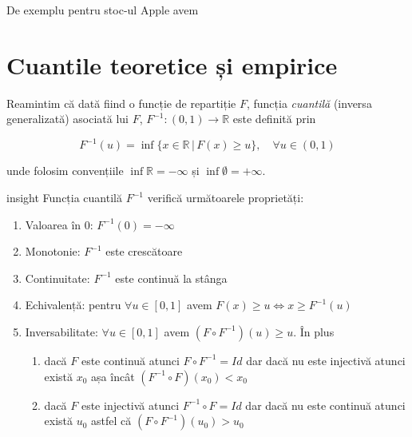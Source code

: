 \documentclass[]{article}
\newenvironment{Shaded}{\begin{snugshade}}{\end{snugshade}}
\newcommand{\KeywordTok}[1]{\textcolor[rgb]{0.13,0.29,0.53}{\textbf{#1}}}
\newcommand{\DecValTok}[1]{\textcolor[rgb]{0.00,0.00,0.81}{#1}}
\newcommand{\FloatTok}[1]{\textcolor[rgb]{0.00,0.00,0.81}{#1}}
\newcommand{\OperatorTok}[1]{\textcolor[rgb]{0.81,0.36,0.00}{\textbf{#1}}}
\newcommand{\NormalTok}[1]{#1}
\providecommand{\tightlist}{%
  \setlength{\itemsep}{0pt}\setlength{\parskip}{0pt}}
\newenvironment{frshaded_insight*}{%
  \def\FrameCommand{\fboxrule=\FrameRule\fboxsep=\FrameSep \fcolorbox{framecolor_insight}{shadecolor_insight}}%
  \MakeFramed {\advance\hsize-\width \FrameRestore}}%
{\endMakeFramed}
\newenvironment{rmdblock_insight}[1]
  {\begin{frshaded_insight*}
  \begin{itemize}
  \renewcommand{\labelitemi}{
    \raisebox{-.7\height}[0pt][0pt]{
      {\setkeys{Gin}{width=2em,keepaspectratio}\texttt{[image: images/icons/\#1]}}
    }
  }
  \item
  }
  {
  \end{itemize}
  \end{frshaded_insight*}
  }
\newenvironment{rmdinsight}
  {\begin{rmdblock_insight}{insight}}
  {\end{rmdblock_insight}}
\begin{document}
De exemplu pentru stoc-ul Apple avem

\begin{Shaded}
\end{Shaded}

\hypertarget{sec:cuantile}{\section{Cuantile teoretice și
empirice}\label{sec:cuantile}}

Reamintim că dată fiind o funcție de repartiție \(F\), funcția
\emph{cuantilă} (inversa generalizată) asociată lui \(F\),
\(F^{-1}:(0,1)\to\mathbb{R}\) este definită prin

\[
  F^{-1}(u) = \inf\{x\in\mathbb{R}\,|\,F(x)\geq u\}, \quad \forall u\in(0,1)
\]

unde folosim convențiile \(\inf\mathbb{R} = -\infty\) și
\(\inf\emptyset = +\infty\).

\begin{rmdinsight}
Funcția cuantilă \(F^{-1}\) verifică următoarele proprietăți:

\begin{enumerate}
\def\labelenumi{\arabic{enumi})}
\tightlist
\item
  Valoarea în \(0\): \(F^{-1}(0) = -\infty\)
\item
  Monotonie: \(F^{-1}\) este crescătoare
\item
  Continuitate: \(F^{-1}\) este continuă la stânga
\item
  Echivalență: pentru \(\forall u\in[0,1]\) avem
  \(F(x)\geq u \iff x\geq F^{-1}(u)\)
\item
  Inversabilitate: \(\forall u\in[0,1]\) avem
  \((F\circ F^{-1})(u)\geq u\). În plus

  \begin{enumerate}
  \def\labelenumii{\alph{enumii})}
  \tightlist
  \item
    dacă \(F\) este continuă atunci \(F\circ F^{-1} = Id\) dar dacă nu
    este injectivă atunci există \(x_0\) așa încât
    \((F^{-1}\circ F)(x_0)<x_0\)
  \item
    dacă \(F\) este injectivă atunci \(F^{-1}\circ F = Id\) dar dacă nu
    este continuă atunci există \(u_0\) astfel că
    \((F\circ F^{-1})(u_0)>u_0\)
  \end{enumerate}
\end{enumerate}
\end{rmdinsight}
\end{document}
